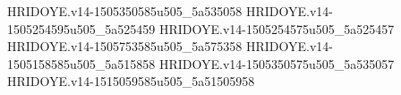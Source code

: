 HRIDOYE.v14-1505350585u505_5a535058
HRIDOYE.v14-1505254595u505_5a525459
HRIDOYE.v14-1505254575u505_5a525457
HRIDOYE.v14-1505753585u505_5a575358
HRIDOYE.v14-1505158585u505_5a515858
HRIDOYE.v14-1505350575u505_5a535057
HRIDOYE.v14-1515059585u505_5a51505958
